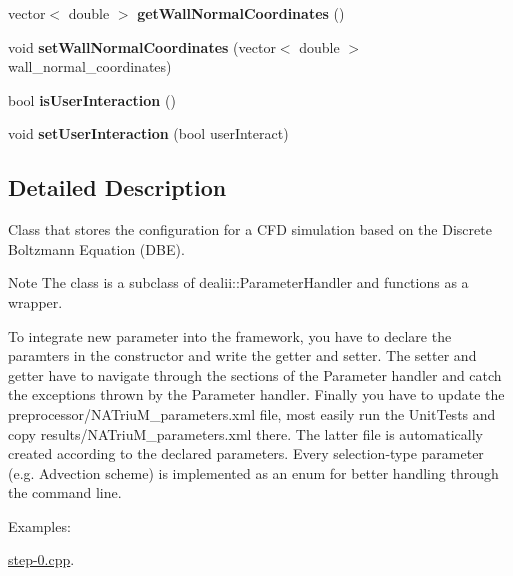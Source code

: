 \begin{DoxyCompactItemize}
\item 
\hypertarget{classnatrium_1_1SolverConfiguration_a2bd29858bcdb09e68f33a6698d902a23}{
vector$<$ double $>$ {\bfseries getWallNormalCoordinates} ()}
\label{classnatrium_1_1SolverConfiguration_a2bd29858bcdb09e68f33a6698d902a23}

\item 
\hypertarget{classnatrium_1_1SolverConfiguration_a29be37fd46b043396635ea5f05aaf480}{
void {\bfseries setWallNormalCoordinates} (vector$<$ double $>$ wall\_\-normal\_\-coordinates)}
\label{classnatrium_1_1SolverConfiguration_a29be37fd46b043396635ea5f05aaf480}

\item 
\hypertarget{classnatrium_1_1SolverConfiguration_a6e41f8ce5da4ecafe2e4326997e79f3d}{
bool {\bfseries isUserInteraction} ()}
\label{classnatrium_1_1SolverConfiguration_a6e41f8ce5da4ecafe2e4326997e79f3d}

\item 
\hypertarget{classnatrium_1_1SolverConfiguration_ad013b9240ee7ae0d5cc43ff5f588c3f3}{
void {\bfseries setUserInteraction} (bool userInteract)}
\label{classnatrium_1_1SolverConfiguration_ad013b9240ee7ae0d5cc43ff5f588c3f3}

\end{DoxyCompactItemize}


\subsection{Detailed Description}
Class that stores the configuration for a CFD simulation based on the Discrete Boltzmann Equation (DBE). \begin{DoxyNote}{Note}
The class is a subclass of dealii::ParameterHandler and functions as a wrapper. 

To integrate new parameter into the framework, you have to declare the paramters in the constructor and write the getter and setter. The setter and getter have to navigate through the sections of the Parameter handler and catch the exceptions thrown by the Parameter handler. Finally you have to update the preprocessor/NATriuM\_\-parameters.xml file, most easily run the UnitTests and copy results/NATriuM\_\-parameters.xml there. The latter file is automatically created according to the declared parameters. Every selection-\/type parameter (e.g. Advection scheme) is implemented as an enum for better handling through the command line. 
\end{DoxyNote}
\begin{Desc}
\item[Examples: ]\par


\hyperlink{step-0_8cpp-example}{step-\/0.cpp}.\end{Desc}


